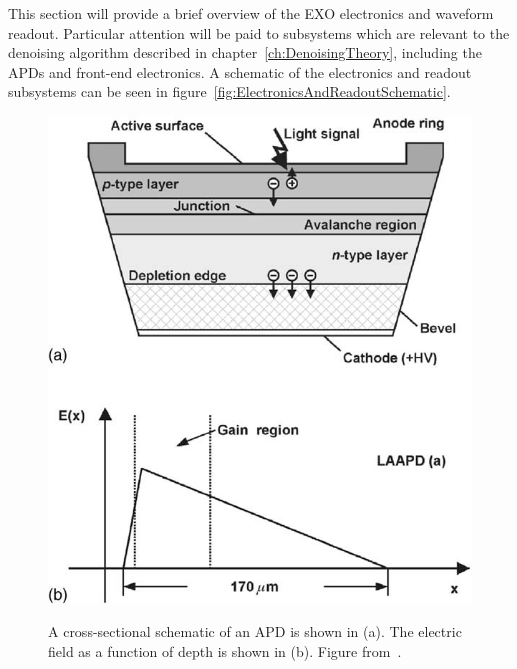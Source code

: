 This section will provide a brief overview of the EXO electronics and waveform readout.  Particular attention will be paid to subsystems which are relevant to the denoising algorithm described in chapter~\ref{ch:DenoisingTheory}, including the APDs and front-end electronics.  A schematic of the electronics and readout subsystems can be seen in figure~\ref{fig:ElectronicsAndReadoutSchematic}.

\begin{figure}
\begin{center}
\includegraphics[keepaspectratio=true,width=\textwidth]{APDCrossSection.png}
\end{center}
\renewcommand{\baselinestretch}{1}
\small\normalsize
\begin{quote}
\caption{A cross-sectional schematic of an APD is shown in (a).  The electric field as a function of depth is shown in (b).  Figure from~\cite{Moszynski2002504}.}
\label{fig:APDCrossSection}
\end{quote}
\end{figure}
\renewcommand{\baselinestretch}{2}
\small\normalsize

